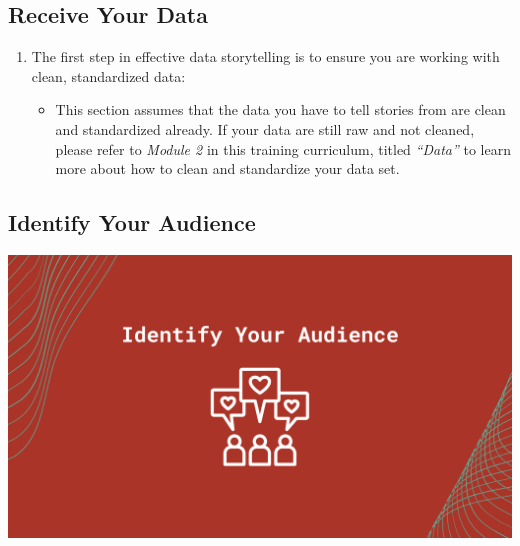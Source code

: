 \documentclass[
]{book}
\providecommand{\tightlist}{%
  \setlength{\itemsep}{0pt}\setlength{\parskip}{0pt}}
\begin{document}
\hypertarget{receive-your-data}{%
\subsection{Receive Your Data}\label{receive-your-data}}

\begin{enumerate}
\def\labelenumi{\arabic{enumi}.}
\tightlist
\item
  The first step in effective data storytelling is to ensure you are working with clean, standardized data:

  \begin{itemize}
  \tightlist
  \item
    This section assumes that the data you have to tell stories from are clean and standardized already. If your data are still raw and not cleaned, please refer to \emph{Module 2} in this training curriculum, titled \emph{``Data''} to learn more about how to clean and standardize your data set.
  \end{itemize}
\end{enumerate}

\hypertarget{identify-your-audience}{%
\subsection{Identify Your Audience}\label{identify-your-audience}}

\includegraphics{images/Data-Storytelling-2.png}
\end{document}
